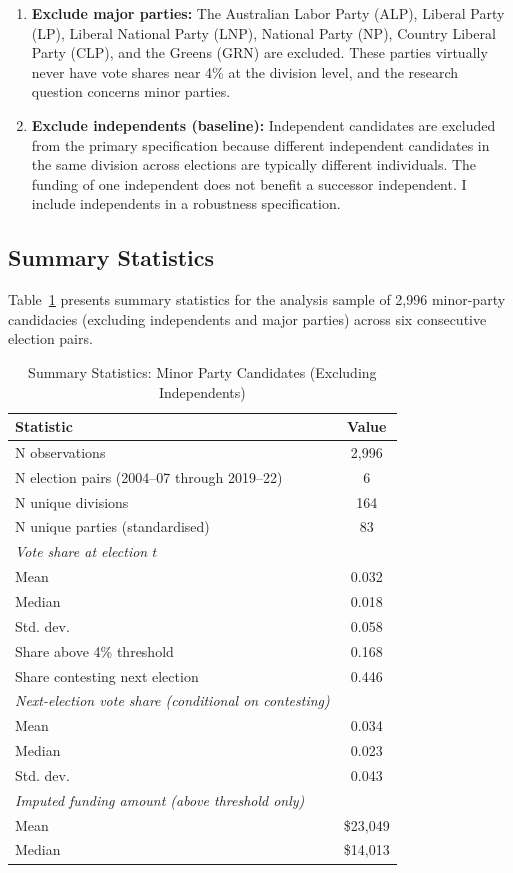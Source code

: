 \documentclass[12pt, a4paper]{article}
\begin{document}
\begin{enumerate}
    \item \textbf{Exclude major parties:} The Australian Labor Party (ALP), Liberal Party (LP), Liberal National Party (LNP), National Party (NP), Country Liberal Party (CLP), and the Greens (GRN) are excluded. These parties virtually never have vote shares near 4\% at the division level, and the research question concerns minor parties.

    \item \textbf{Exclude independents (baseline):} Independent candidates are excluded from the primary specification because different independent candidates in the same division across elections are typically different individuals. The funding of one independent does not benefit a successor independent. I include independents in a robustness specification.
\end{enumerate}

\subsection{Summary Statistics}

Table~\ref{tab:summary} presents summary statistics for the analysis sample of 2,996 minor-party candidacies (excluding independents and major parties) across six consecutive election pairs.

\begin{table}[H]
\centering
\caption{Summary Statistics: Minor Party Candidates (Excluding Independents)}
\label{tab:summary}
\begin{tabular}{lc}
\toprule
\textbf{Statistic} & \textbf{Value} \\
\midrule
N observations & 2,996 \\
N election pairs (2004--07 through 2019--22) & 6 \\
N unique divisions & 164 \\
N unique parties (standardised) & 83 \\
\midrule
\textit{Vote share at election $t$} & \\
\quad Mean & 0.032 \\
\quad Median & 0.018 \\
\quad Std. dev. & 0.058 \\
\midrule
Share above 4\% threshold & 0.168 \\
Share contesting next election & 0.446 \\
\midrule
\textit{Next-election vote share (conditional on contesting)} & \\
\quad Mean & 0.034 \\
\quad Median & 0.023 \\
\quad Std. dev. & 0.043 \\
\midrule
\textit{Imputed funding amount (above threshold only)} & \\
\quad Mean & \$23,049 \\
\quad Median & \$14,013 \\
\bottomrule
\end{tabular}
\end{table}
\end{document}
